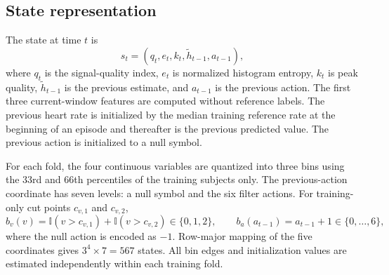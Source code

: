 \documentclass{elektr}
\begin{document}
\subsection{State representation}

The state at time $t$ is
\begin{equation}
 s_t=(q_t,e_t,k_t,\widetilde h_{t-1},a_{t-1}),
 \label{eq:state}
\end{equation}
where $q_t$ is the signal-quality index, $e_t$ is normalized histogram entropy, $k_t$ is peak quality, $\widetilde h_{t-1}$ is the previous estimate, and $a_{t-1}$ is the previous action. The first three current-window features are computed without reference labels. The previous heart rate is initialized by the median training reference rate at the beginning of an episode and thereafter is the previous predicted value. The previous action is initialized to a null symbol.

For each fold, the four continuous variables are quantized into three bins using the 33rd and 66th percentiles of the training subjects only. The previous-action coordinate has seven levels: a null symbol and the six filter actions. For training-only cut points $c_{v,1}$ and $c_{v,2}$,
\begin{equation}
 b_v(v)=\mathbb{I}(v>c_{v,1})+\mathbb{I}(v>c_{v,2})\in\{0,1,2\},
 \qquad
 b_a(a_{t-1})=a_{t-1}+1\in\{0,\ldots,6\},
 \label{eq:binning}
\end{equation}
where the null action is encoded as $-1$. Row-major mapping of the five coordinates gives $3^4\times7=567$ states. All bin edges and initialization values are estimated independently within each training fold.
\end{document}
